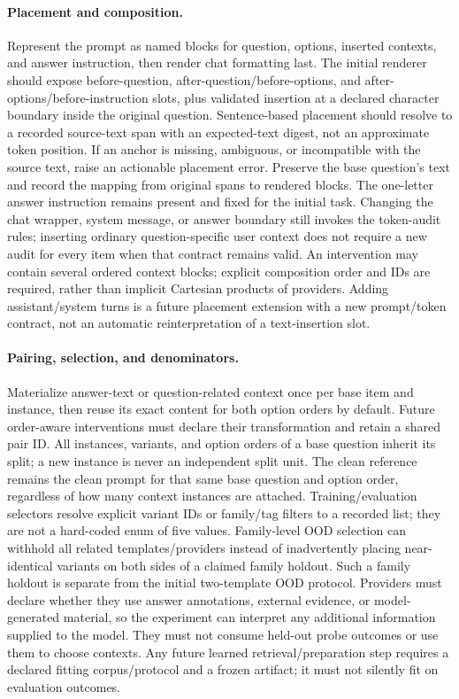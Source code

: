 \documentclass[11pt]{article}
\begin{document}
\paragraph{Placement and composition.}
Represent the prompt as named blocks for question, options, inserted contexts, and answer instruction, then render chat formatting last.
The initial renderer should expose before-question, after-question/before-options, and after-options/before-instruction slots, plus validated insertion at a declared character boundary inside the original question.
Sentence-based placement should resolve to a recorded source-text span with an expected-text digest, not an approximate token position.
If an anchor is missing, ambiguous, or incompatible with the source text, raise an actionable placement error.
Preserve the base question's text and record the mapping from original spans to rendered blocks.
The one-letter answer instruction remains present and fixed for the initial task.
Changing the chat wrapper, system message, or answer boundary still invokes the token-audit rules; inserting ordinary question-specific user context does not require a new audit for every item when that contract remains valid.
An intervention may contain several ordered context blocks; explicit composition order and IDs are required, rather than implicit Cartesian products of providers.
Adding assistant/system turns is a future placement extension with a new prompt/token contract, not an automatic reinterpretation of a text-insertion slot.

\paragraph{Pairing, selection, and denominators.}
Materialize answer-text or question-related context once per base item and instance, then reuse its exact content for both option orders by default.
Future order-aware interventions must declare their transformation and retain a shared pair ID.
All instances, variants, and option orders of a base question inherit its split; a new instance is never an independent split unit.
The clean reference remains the clean prompt for that same base question and option order, regardless of how many context instances are attached.
Training/evaluation selectors resolve explicit variant IDs or family/tag filters to a recorded list; they are not a hard-coded enum of five values.
Family-level OOD selection can withhold all related templates/providers instead of inadvertently placing near-identical variants on both sides of a claimed family holdout.
Such a family holdout is separate from the initial two-template OOD protocol.
Providers must declare whether they use answer annotations, external evidence, or model-generated material, so the experiment can interpret any additional information supplied to the model.
They must not consume held-out probe outcomes or use them to choose contexts.
Any future learned retrieval/preparation step requires a declared fitting corpus/protocol and a frozen artifact; it must not silently fit on evaluation outcomes.
\end{document}
